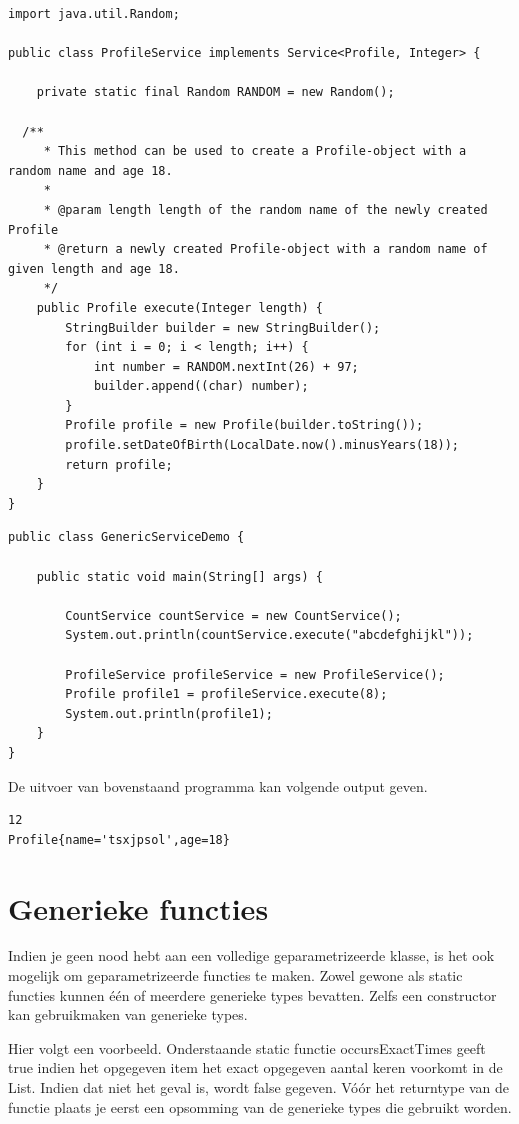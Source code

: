\documentclass{tstextbook}
\begin{document}
\begin{lstlisting}
import java.util.Random;

public class ProfileService implements Service<Profile, Integer> {

	private static final Random RANDOM = new Random();

  /**
	 * This method can be used to create a Profile-object with a random name and age 18.
	 *
	 * @param length length of the random name of the newly created Profile
	 * @return a newly created Profile-object with a random name of given length and age 18.
	 */
	public Profile execute(Integer length) {
		StringBuilder builder = new StringBuilder();
		for (int i = 0; i < length; i++) {
			int number = RANDOM.nextInt(26) + 97;
			builder.append((char) number);
		}
		Profile profile = new Profile(builder.toString());
		profile.setDateOfBirth(LocalDate.now().minusYears(18));
		return profile;
	}
}
\end{lstlisting}


\begin{lstlisting}
public class GenericServiceDemo {

	public static void main(String[] args) {

		CountService countService = new CountService();
		System.out.println(countService.execute("abcdefghijkl"));

		ProfileService profileService = new ProfileService();
		Profile profile1 = profileService.execute(8);
		System.out.println(profile1);
	}
}
\end{lstlisting}

De uitvoer van bovenstaand programma kan volgende output geven.
\begin{verbatim}
12
Profile{name='tsxjpsol',age=18}
\end{verbatim}


\section{Generieke functies}

Indien je geen nood hebt aan een volledige geparametrizeerde klasse, is het ook mogelijk om geparametrizeerde functies te maken. Zowel gewone als static functies kunnen \'e\'en of meerdere generieke types bevatten. Zelfs een constructor kan gebruikmaken van  generieke types.

Hier volgt een voorbeeld. 
Onderstaande static functie occursExactTimes geeft true indien het opgegeven item het exact opgegeven aantal keren voorkomt in de List. Indien dat niet het geval is, wordt false gegeven.
V\'o\'or het returntype van de functie plaats je eerst een opsomming van de generieke types die gebruikt worden. 
 
\end{document}
